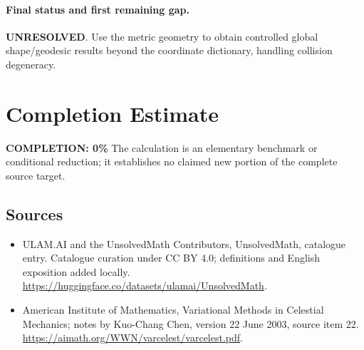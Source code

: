 \documentclass[11pt]{article}
\begin{document}
\paragraph{Final status and first remaining gap.}
\textbf{UNRESOLVED}. Use the metric geometry to obtain controlled global shape/geodesic results beyond the coordinate dictionary, handling collision degeneracy.

\section{Completion Estimate}
\noindent\textbf{COMPLETION: 0\%}
The calculation is an elementary benchmark or conditional reduction; it establishes no claimed new portion of the complete source target.

\subsection{Sources}
\begin{itemize}
\item[\hypertarget{source:statement:1}{S1}] ULAM.AI and the UnsolvedMath Contributors, UnsolvedMath, catalogue entry. Catalogue curation under CC BY 4.0; definitions and English exposition added locally.
\url{https://huggingface.co/datasets/ulamai/UnsolvedMath}.
\item[\hypertarget{source:statement:2}{S2}] American Institute of Mathematics, Variational Methods in Celestial Mechanics; notes by Kuo-Chang Chen, version 22 June 2003, source item 22.
\url{https://aimath.org/WWN/varcelest/varcelest.pdf}.
\end{itemize}
\label{end:statement}
\end{document}
